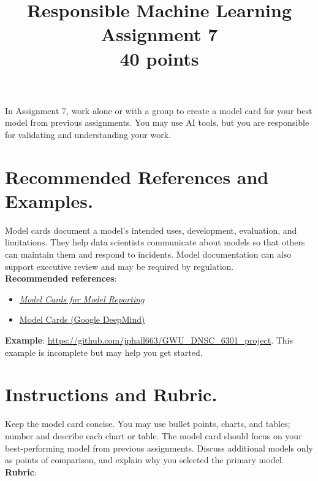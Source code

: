 \documentclass[fleqn]{article}
\title{Responsible Machine Learning\\\Large{Assignment 7}\\\Large{40 points}}
\begin{document}
\maketitle

\noindent In Assignment 7, work alone or with a group to create a model card for your best model from previous assignments. You may use AI tools, but you are responsible for validating and understanding your work.

\section{Recommended References and Examples.}

Model cards document a model's intended uses, development, evaluation, and limitations. They help data scientists communicate about models so that others can maintain them and respond to incidents. Model documentation can also support executive review and may be required by regulation.\\

\noindent\textbf{Recommended references}:
\begin{itemize}
\item \href{https://arxiv.org/pdf/1810.03993.pdf}{\textit{Model Cards for Model Reporting}}
\item \href{https://deepmind.google/models/model-cards/}{Model Cards (Google DeepMind)}
\end{itemize}

\noindent\textbf{Example}: \url{https://github.com/jphall663/GWU_DNSC_6301_project}. This example is incomplete but may help you get started.

\section{Instructions and Rubric.}

Keep the model card concise. You may use bullet points, charts, and tables; number and describe each chart or table. The model card should focus on your best-performing model from previous assignments. Discuss additional models only as points of comparison, and explain why you selected the primary model.\\

\noindent\textbf{Rubric}:
\end{document}
